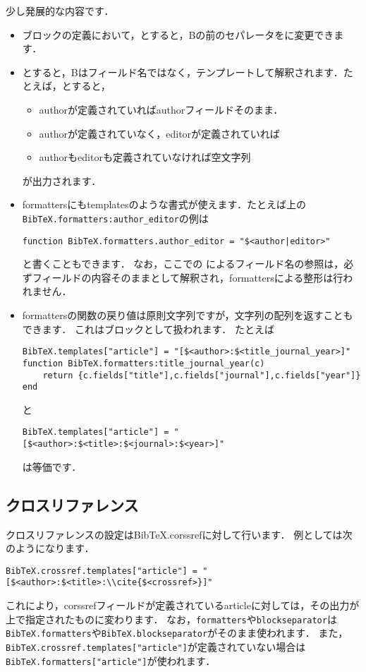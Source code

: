 \documentclass[a4paper]{ltjsarticle}
\newcommand{\luafunc}[1]{\texttt{#1}}
\newcommand*{\luavar}[1]{\texttt{#1}}
\begin{document}
少し発展的な内容です．
\begin{itemize}
\item ブロックの定義において，\luastring{[A:@S<sep>B:C]}とすると，Bの前のセパレータをに変更できます．
\item {}とすると，Bはフィールド名ではなく，テンプレートして解釈されます．たとえば，とすると，
\begin{itemize}
\item authorが定義されていればauthorフィールドそのまま．
\item authorが定義されていなく，editorが定義されていれば
\item authorもeditorも定義されていなければ空文字列
\end{itemize}
が出力されます．
\item formattersにもtemplatesのような書式が使えます．たとえば上の\luafunc{BibTeX.formatters:author\_editor}の例は
\begin{lstlisting}
function BibTeX.formatters.author_editor = "$<author|editor>"
\end{lstlisting}
と書くこともできます．
なお，ここでの%
によるフィールド名の参照は，必ずフィールドの内容そのままとして解釈され，formattersによる整形は行われません．
\item formattersの関数の戻り値は原則文字列ですが，文字列の配列を返すこともできます．
これはブロックとして扱われます．
たとえば
\begin{lstlisting}
BibTeX.templates["article"] = "[$<author>:$<title_journal_year>]"
function BibTeX.formatters:title_journal_year(c)
    return {c.fields["title"],c.fields["journal"],c.fields["year"]}
end
\end{lstlisting}
と
\begin{lstlisting}
BibTeX.templates["article"] = "[$<author>:$<title>:$<journal>:$<year>]"
\end{lstlisting}
は等価です．
\end{itemize}

\subsection{クロスリファレンス}
クロスリファレンスの設定はBibTeX.corssrefに対して行います．
例としては次のようになります．
\begin{lstlisting}
BibTeX.crossref.templates["article"] = "[$<author>:$<title>:\\cite{$<crossref>}]"
\end{lstlisting}
これにより，corssrefフィールドが定義されているarticleに対しては，その出力が上で指定されたものに変わります．
なお，\luavar{formatters}や\luavar{blockseparator}は\luavar{BibTeX.formatters}や\luavar{BibTeX.blockseparator}がそのまま使われます．
また，\luavar{BibTeX.crossref.templates["article"]}が定義されていない場合は\luavar{BibTeX.formatters["article"]}が使われます．
\end{document}

